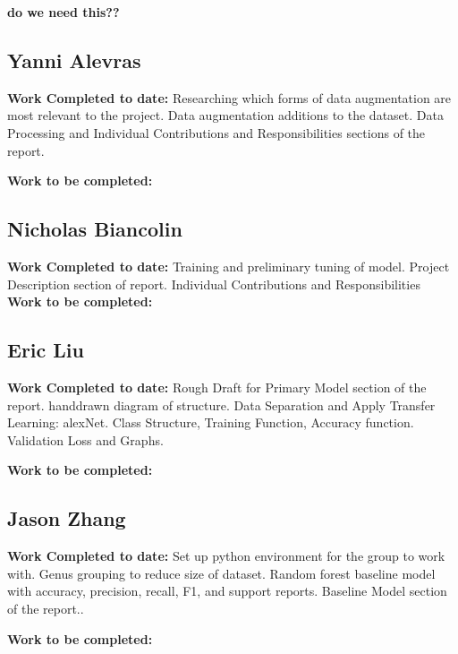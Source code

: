 \documentclass{article} %
\begin{document}
\textbf{do we need this??}

\subsection{Yanni Alevras}
\label{subsec:yanni_alevras}

\textbf{Work Completed to date:}
Researching which forms of data augmentation are most relevant to the project. Data augmentation additions to the dataset. Data Processing and Individual Contributions and Responsibilities sections of the report. 

\textbf{Work to be completed:}

\subsection{Nicholas Biancolin}
\label{subsec:nicholas_biancolin}

\textbf{Work Completed to date:}
Training and preliminary tuning of model. Project Description section of report. Individual Contributions and Responsibilities
\textbf{Work to be completed:}

\subsection{Eric Liu}
\label{subsec:eric_liu}

\textbf{Work Completed to date:}
Rough Draft for Primary Model section of the report. handdrawn diagram of structure. Data Separation and Apply Transfer Learning: alexNet. Class Structure, Training Function, Accuracy function. Validation Loss and Graphs.

\textbf{Work to be completed:}

\subsection{Jason Zhang}
\label{subsec:jason_zhang}

\textbf{Work Completed to date:}
Set up python environment for the group to work with. Genus grouping to reduce size of dataset. Random forest baseline model with accuracy, precision, recall, F1, and support reports. Baseline Model section of the report..

\textbf{Work to be completed:}
\end{document}
